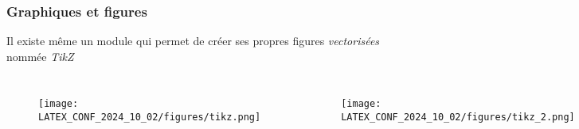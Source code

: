 \begin{frame}
    \frametitle{Graphiques et figures}
    Il existe même un module qui permet de créer ses propres figures \textit{vectorisées} nommée \textcolor{hard_green}{\textit{TikZ}}\footnotemark
    \vfill
    \pause
    \begin{columns}
        \begin{figure}
            \centering
            \texttt{[image: LATEX\_CONF\_2024\_10\_02/figures/tikz.png]}
            \label{fig: tikz}
        \end{figure}
        \pause
        \begin{figure}
            \centering
            \texttt{[image: LATEX\_CONF\_2024\_10\_02/figures/tikz\_2.png]}
            \label{fig: tikz}
        \end{figure}
        \pause
        \begin{figure}
            \centering
            \texttt{[image: LATEX\_CONF\_2024\_10\_02/figures/tikz\_3.png]}
            \label{fig: tikz}
        \end{figure}
    \end{columns}
    \vfill
\end{frame}